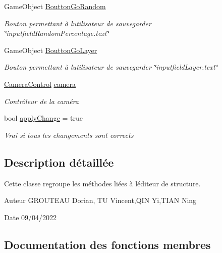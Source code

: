 \begin{DoxyCompactItemize}
Game\+Object \mbox{\hyperlink{class_edit_mode_manager_a945ba1a2fb0835b8dc12d723683eeb33}{Boutton\+Go\+Random}}
\begin{DoxyCompactList}\small\item\em Bouton permettant à l\textquotesingle{}utilisateur de sauvegarder \char`\"{}inputfield\+Random\+Percentage.\+text\char`\"{} \end{DoxyCompactList}\item 
Game\+Object \mbox{\hyperlink{class_edit_mode_manager_ad5c5ed8457e18b2adc75f38498d28e92}{Boutton\+Go\+Layer}}
\begin{DoxyCompactList}\small\item\em Bouton permettant à l\textquotesingle{}utilisateur de sauvegarder \char`\"{}inputfield\+Layer.\+text\char`\"{} \end{DoxyCompactList}\item 
\mbox{\hyperlink{class_camera_control}{Camera\+Control}} \mbox{\hyperlink{class_edit_mode_manager_a5cfa2a3b82fbc098b2fc63f043f1b07b}{camera}}
\begin{DoxyCompactList}\small\item\em Contrôleur de la caméra \end{DoxyCompactList}\item 
bool \mbox{\hyperlink{class_edit_mode_manager_af3f46c507dd0557ad3890647be53bdb0}{apply\+Change}} = true
\begin{DoxyCompactList}\small\item\em Vrai si tous les changements sont corrects \end{DoxyCompactList}\end{DoxyCompactItemize}


\subsection{Description détaillée}
Cette classe regroupe les méthodes liées à l\textquotesingle{}éditeur de structure. 

\begin{DoxyAuthor}{Auteur}
G\+R\+O\+U\+T\+E\+AU Dorian, TU Vincent,Q\+IN Yi,T\+I\+AN Ning 
\end{DoxyAuthor}
\begin{DoxyDate}{Date}
09/04/2022 
\end{DoxyDate}


\subsection{Documentation des fonctions membres}
\mbox{\label{class_edit_mode_manager_ac9e73b653a4af1d833a2df57c45cf4cf}} 
